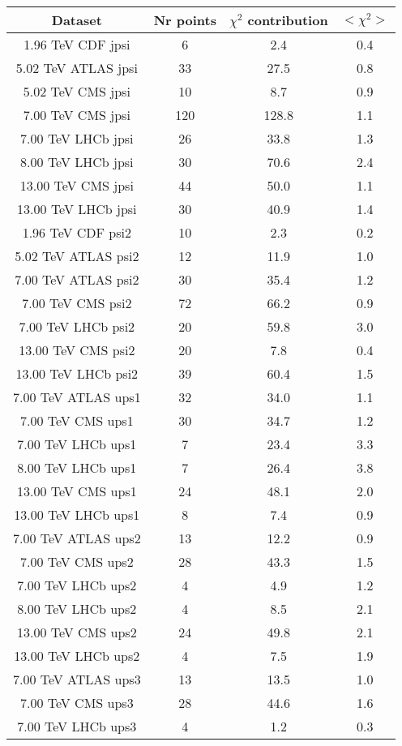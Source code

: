 \begin{table}[h!]
\centering
\begin{tabular}{c|c|c|c}
Dataset & Nr points & $\chi^2$ contribution & $<\chi^2>$ \\
\hline
1.96 TeV CDF jpsi & 6 & 2.4 & 0.4 \\
5.02 TeV ATLAS jpsi & 33 & 27.5 & 0.8 \\
5.02 TeV CMS jpsi & 10 & 8.7 & 0.9 \\
7.00 TeV CMS jpsi & 120 & 128.8 & 1.1 \\
7.00 TeV LHCb jpsi & 26 & 33.8 & 1.3 \\
8.00 TeV LHCb jpsi & 30 & 70.6 & 2.4 \\
13.00 TeV CMS jpsi & 44 & 50.0 & 1.1 \\
13.00 TeV LHCb jpsi & 30 & 40.9 & 1.4 \\
1.96 TeV CDF psi2 & 10 & 2.3 & 0.2 \\
5.02 TeV ATLAS psi2 & 12 & 11.9 & 1.0 \\
7.00 TeV ATLAS psi2 & 30 & 35.4 & 1.2 \\
7.00 TeV CMS psi2 & 72 & 66.2 & 0.9 \\
7.00 TeV LHCb psi2 & 20 & 59.8 & 3.0 \\
13.00 TeV CMS psi2 & 20 & 7.8 & 0.4 \\
13.00 TeV LHCb psi2 & 39 & 60.4 & 1.5 \\
7.00 TeV ATLAS ups1 & 32 & 34.0 & 1.1 \\
7.00 TeV CMS ups1 & 30 & 34.7 & 1.2 \\
7.00 TeV LHCb ups1 & 7 & 23.4 & 3.3 \\
8.00 TeV LHCb ups1 & 7 & 26.4 & 3.8 \\
13.00 TeV CMS ups1 & 24 & 48.1 & 2.0 \\
13.00 TeV LHCb ups1 & 8 & 7.4 & 0.9 \\
7.00 TeV ATLAS ups2 & 13 & 12.2 & 0.9 \\
7.00 TeV CMS ups2 & 28 & 43.3 & 1.5 \\
7.00 TeV LHCb ups2 & 4 & 4.9 & 1.2 \\
8.00 TeV LHCb ups2 & 4 & 8.5 & 2.1 \\
13.00 TeV CMS ups2 & 24 & 49.8 & 2.1 \\
13.00 TeV LHCb ups2 & 4 & 7.5 & 1.9 \\
7.00 TeV ATLAS ups3 & 13 & 13.5 & 1.0 \\
7.00 TeV CMS ups3 & 28 & 44.6 & 1.6 \\
7.00 TeV LHCb ups3 & 4 & 1.2 & 0.3 \\

\end{tabular}
\end{table}
